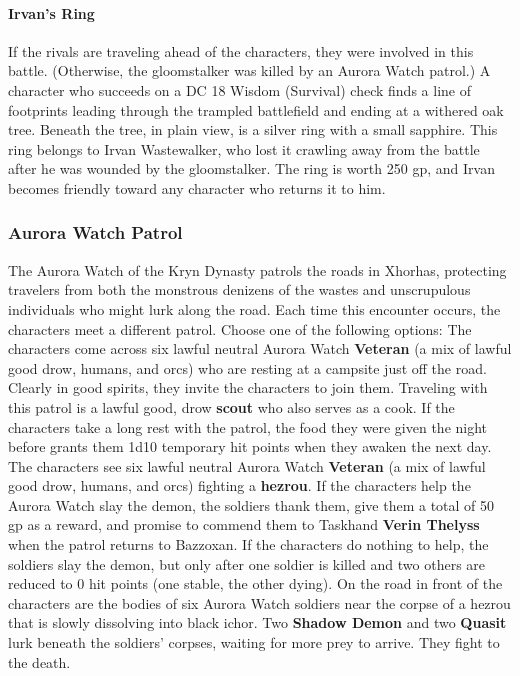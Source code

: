 \documentclass[10pt,a4,twoside,twocolumn,openany,nodeprecatedcode]{dndbook}
\begin{document}
\paragraph{Irvan's Ring}
If the rivals are traveling ahead of the characters, they were involved in this battle. (Otherwise, the gloomstalker was killed by an Aurora Watch patrol.) A character who succeeds on a DC 18 Wisdom (Survival) check finds a line of footprints leading through the trampled battlefield and ending at a withered oak tree. Beneath the tree, in plain view, is a silver ring with a small sapphire. This ring belongs to Irvan Wastewalker, who lost it crawling away from the battle after he was wounded by the gloomstalker. The ring is worth 250 gp, and Irvan becomes friendly toward any character who returns it to him.
\subsubsection{Aurora Watch Patrol}
The Aurora Watch of the Kryn Dynasty patrols the roads in Xhorhas, protecting travelers from both the monstrous denizens of the wastes and unscrupulous individuals who might lurk along the road. Each time this encounter occurs, the characters meet a different patrol. Choose one of the following options:
{{The characters come across six lawful neutral Aurora Watch \textbf{Veteran} (a mix of lawful good drow, humans, and orcs) who are resting at a campsite just off the road. Clearly in good spirits, they invite the characters to join them. Traveling with this patrol is a lawful good, drow \textbf{scout} who also serves as a cook. If the characters take a long rest with the patrol, the food they were given the night before grants them 1d10 temporary hit points when they awaken the next day.}}
{{The characters see six lawful neutral Aurora Watch \textbf{Veteran} (a mix of lawful good drow, humans, and orcs) fighting a \textbf{hezrou}. If the characters help the Aurora Watch slay the demon, the soldiers thank them, give them a total of 50 gp as a reward, and promise to commend them to Taskhand \textbf{Verin Thelyss} when the patrol returns to Bazzoxan. If the characters do nothing to help, the soldiers slay the demon, but only after one soldier is killed and two others are reduced to 0 hit points (one stable, the other dying).}}
{{On the road in front of the characters are the bodies of six Aurora Watch soldiers near the corpse of a hezrou that is slowly dissolving into black ichor. Two \textbf{Shadow Demon} and two \textbf{Quasit} lurk beneath the soldiers' corpses, waiting for more prey to arrive. They fight to the death.}}
\end{document}

